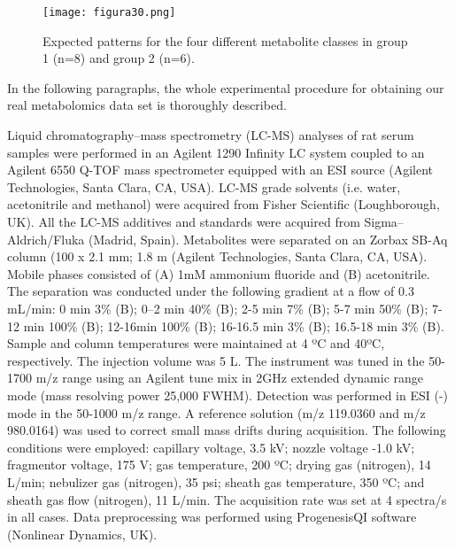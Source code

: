 \begin{figure}[hbtp]
	\centering
\texttt{[image: figura30.png]}
\caption[Expected patterns for the four different metabolite classes in the real metabolomics data set]{Expected patterns for the four different metabolite classes in group 1 (n=8) and group 2 (n=6).}
\label{figura30}
\end{figure}

In the following paragraphs, the whole experimental procedure for obtaining our real metabolomics data set is thoroughly described. 

Liquid chromatography–mass spectrometry (LC-MS) analyses of rat serum samples were performed in an Agilent 1290 Infinity LC system coupled to an Agilent 6550 Q-TOF mass spectrometer equipped with an ESI source (Agilent Technologies, Santa Clara, CA, USA). LC-MS grade solvents (i.e. water, acetonitrile and methanol) were acquired from Fisher Scientific (Loughborough, UK). All the LC-MS additives and standards were acquired from Sigma–Aldrich/Fluka (Madrid, Spain). Metabolites were separated on an Zorbax SB-Aq column (100 x 2.1 mm; 1.8 {\textmu}m (Agilent Technologies, Santa Clara, CA, USA). Mobile phases consisted of (A) 1mM ammonium fluoride and (B) acetonitrile. The separation was conducted under the following gradient at a flow of 0.3 mL/min: 0 min 3\% (B); 0–2 min 40\% (B); 2-5 min 7\% (B); 5-7 min 50\% (B); 7-12 min 100\% (B); 12-16min 100\% (B); 16-16.5 min 3\% (B); 16.5-18 min 3\% (B). Sample and column temperatures were maintained at 4 ºC and 40ºC, respectively. The injection volume was 5 {\textmu}L. 
The instrument was tuned in the 50-1700 m/z range using an Agilent tune mix in 2GHz extended dynamic range mode (mass resolving power 25,000 FWHM). Detection was performed in ESI (-) mode in the 50-1000 m/z range. A reference solution (m/z 119.0360 and m/z 980.0164) was used to correct small mass drifts during acquisition. The following conditions were employed: capillary voltage, 3.5 kV; nozzle voltage -1.0 kV; fragmentor voltage, 175 V; gas temperature, 200 ºC; drying gas (nitrogen), 14 L/min; nebulizer gas (nitrogen), 35 psi; sheath gas temperature, 350 ºC; and sheath gas flow (nitrogen), 11 L/min. The acquisition rate was set at 4 spectra/s in all cases. Data preprocessing was performed using ProgenesisQI software (Nonlinear Dynamics, UK).

